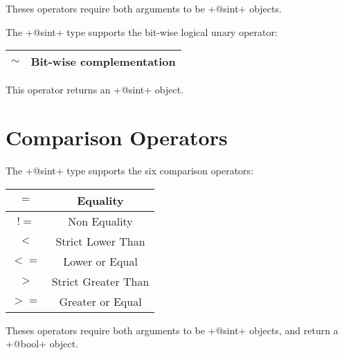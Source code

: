 Theses operators require both arguments to be \ggst+@sint+ objects.\newline


The \ggst+@sint+ type supports the bit-wise logical unary operator:\newline

\begin{tabular}{|c|c|}
\hline
$\sim$ & Bit-wise complementation \\
\hline
\end{tabular}

This operator returns an \ggst+@sint+ object.







\section{Comparison Operators}

The \ggst+@sint+ type supports the six comparison operators:\newline

\begin{tabular}{|c|c|}
\hline
$=$ & Equality \\
\hline
$!=$ & Non Equality \\
\hline
$<$  & Strict Lower Than \\
\hline
$<=$  & Lower or Equal \\
\hline
$>$  & Strict Greater Than \\
\hline
$>=$  & Greater or Equal \\
\hline
\end{tabular}

Theses operators require both arguments to be \ggst+@sint+ objects, and return a \ggst+@bool+ object.


